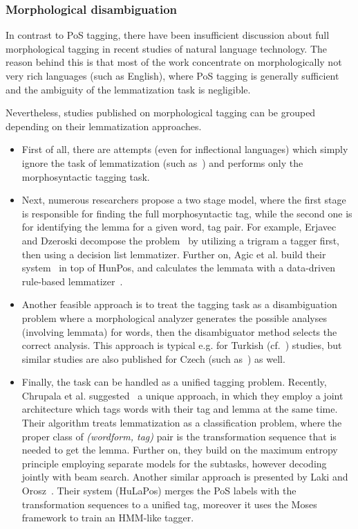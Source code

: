\subsubsection{Morphological disambiguation}

In contrast to PoS tagging, there have been insufficient discussion about full morphological tagging in recent studies of natural language technology.
The reason behind this is that most of the work concentrate on morphologically not very rich languages (such as English), where PoS tagging is generally sufficient and the ambiguity of the lemmatization task is negligible.

Nevertheless, studies published on morphological tagging can be grouped depending on their lemmatization approaches.

\begin{itemize}
  \item First of all, there are attempts (even for inflectional languages) which simply ignore the task of lemmatization (such as~\cite{Hajic,Tufis(román),FinnHunPosos}) and performs only the morphosyntactic tagging task. 
  \item Next, numerous researchers propose a two stage model, where the first stage is responsible for finding the full morphosyntactic tag, while the second one is for identifying the lemma for a given word, tag pair.
For example, Erjavec and Dzeroski decompose the problem~\cite{} by utilizing a trigram a tagger first, then using a decision list lemmatizer.
Further on, Agic et al. build their system~\cite{} in top of HunPos, and calculates the lemmata with a data-driven rule-based lemmatizer~\cite{}. 
  \item Another feasible approach is to treat the tagging task as a disambiguation problem where a morphological analyzer generates the possible analyses (involving lemmata) for words, then the disambiguator method selects the correct analysis.
This approach is typical e.g. for Turkish (cf.~\cite{török_cikkek}) studies, but similar studies are also published for Czech (such as~\cite{valamelyikHajic}) as well.
  \item Finally, the task can be handled as a unified tagging problem.
Recently, Chrupala et al. suggested~\cite{} a unique approach, in which they employ a joint architecture which tags words with their tag and lemma at the same time.
Their algorithm treats lemmatization as a classification problem, where the proper class of \emph{(wordform, tag)} pair is the transformation sequence that is needed to get the lemma.
Further on, they build on the maximum entropy principle employing separate models for the subtasks, however decoding jointly with beam search.
Another similar approach is presented by Laki and Orosz~\cite{}.
Their system (HuLaPos) merges the PoS labels with the transformation sequences to a unified tag, moreover it uses the Moses framework to train an HMM-like tagger.
\end{itemize}
